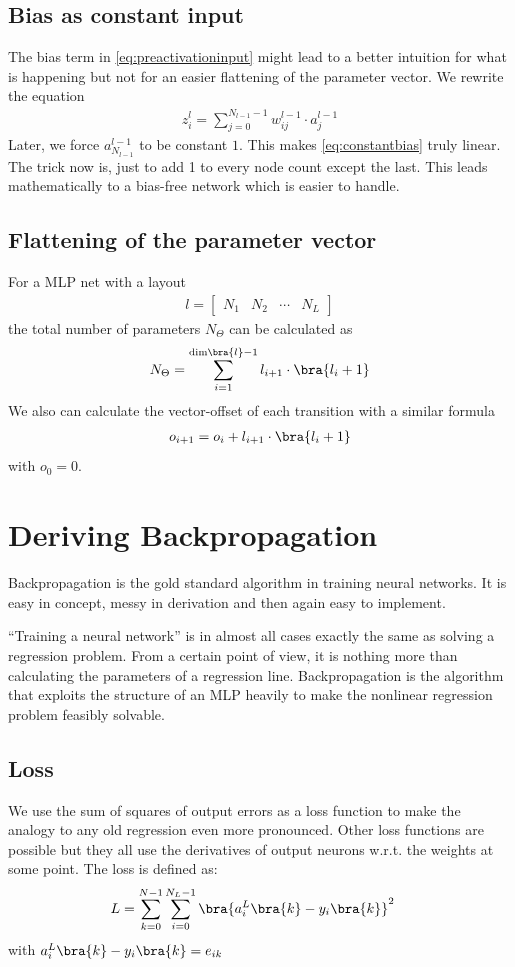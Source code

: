 \subsection{Bias as constant input}
The bias term in \eqref{eq:preactivationinput} might lead to a better intuition for what is happening but not for an easier flattening of the parameter vector. We rewrite the equation
\begin{align}
	\label{eq:constantbias}
	z_i^{l}=\sum\limits_{j=0}^{N_{l-1}-1}w_{ij}^{l-1}\cdot a_j^{l-1}
\end{align}
Later, we force $a_{N_{l-1}}^{l-1}$ to be constant $1$. This makes \eqref{eq:constantbias} truly linear. The trick now is, just to add 1 to every node count except the last. This leads mathematically to a bias-free network which is easier to handle.
\subsection{Flattening of the parameter vector}
For a MLP net with a layout
\begin{align}
	l = \begin{bmatrix}
		N_1&N_2&\cdots&N_L
	\end{bmatrix}
\end{align}
the total number of parameters $	N_\Theta$ can be calculated as 
\begin{align}
	N_\Theta = \sum\limits_{i=1}^{\mathrm{dim}\bra{l}-1}l_{i+1}\cdot\bra{l_{i}+1}
\end{align}
We also can calculate the vector-offset of each transition with a similar formula
\begin{align}
	o_{i+1}=o_i+l_{i+1}\cdot\bra{l_{i}+1}
\end{align}
with $o_0=0$.
\section{Deriving Backpropagation}
Backpropagation is the gold standard algorithm in training neural networks. It is easy in concept, messy in derivation and then again easy to implement. \par
\enquote{Training a neural network} is in almost all cases exactly the same as solving a regression problem. From a certain point of view, it is nothing more than calculating the parameters of a regression line. Backpropagation is the algorithm that exploits the structure of an MLP heavily to make the nonlinear regression problem feasibly solvable.
\subsection{Loss}
We use the sum of squares of output errors as a loss function to make the analogy to any old regression even more pronounced. Other loss functions are possible but they all use the derivatives of output neurons w.r.t. the weights at some point. The loss is defined as:
\begin{align}
	\label{eq:loss}
	L&=\sum\limits_{k=0}^{N-1}\sum\limits_{i=0}^{N_L-1}\bra{a^L_i\bra{k}-y_i\bra{k}}^2
\end{align}
with $a^L_i\bra{k}-y_i\bra{k}=e_{ik}$
